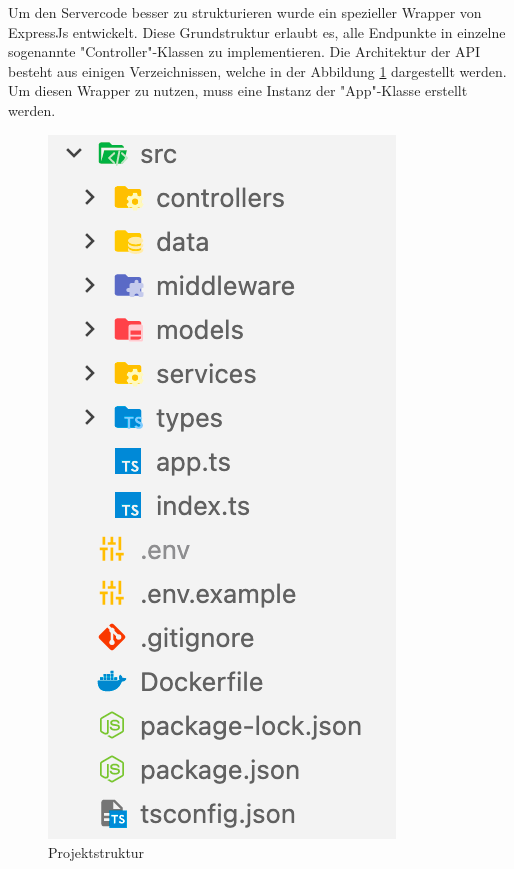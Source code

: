 
Um den Servercode besser zu strukturieren wurde ein spezieller Wrapper von ExpressJs entwickelt. 
Diese Grundstruktur erlaubt es, alle Endpunkte in einzelne sogenannte "Controller"-Klassen zu implementieren. 
Die Architektur der API besteht aus einigen Verzeichnissen, welche in der Abbildung \ref{fig:apiStructure} dargestellt werden. 
Um diesen Wrapper zu nutzen, muss eine Instanz der "App"-Klasse erstellt werden.

\begin{figure}[H]
    \centering
    \includegraphics{media/APITemplate/ProjectStructure.png}
    \caption{Projektstruktur}
    \label{fig:apiStructure}
\end{figure}










